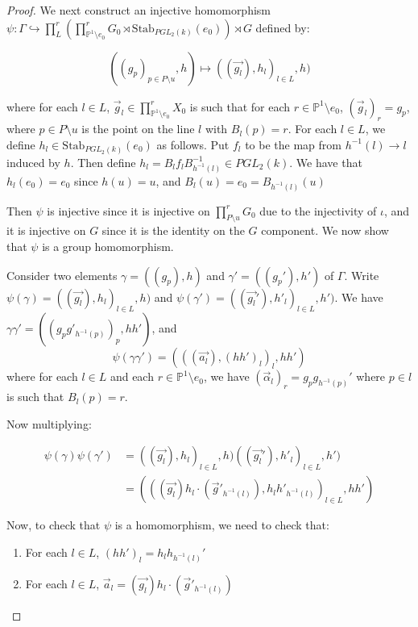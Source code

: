 \documentclass[12pt]{article}
\theoremstyle{definition}
\begin{document}
\begin{proof}
    We next construct an injective homomorphism $\psi: \Gamma \hookrightarrow \prod_L^{r}  (\prod_{\mathbb{P}^1\setminus e_0}^rG_0 \rtimes \mathrm{Stab}_{PGL_2(k)}(e_0)) \rtimes  G$ defined by: 

    $$((g_p)_{p \in P \setminus u}, h) \mapsto ((\vec{g_l}), h_l)_{l \in L}, h)$$

    where for each $l \in L$, $\vec{g}_l \in \prod_{\mathbb{P}^1\setminus e_0}^r X_0$ is such that for each $r \in \mathbb{P}^1 \setminus e_0$, $(\vec{g}_l)_r = g_p$, where $p \in P \setminus u$ is the point on the line $l$ with $B_l(p) = r$. For each $l \in L$, we define $h_l \in \mathrm{Stab}_{PGL_2(k)}(e_0)$ as follows. Put $f_l$ to be the map from $h^{-1}(l) \to l$ induced by $h$. Then define $h_l = B_l f_l B_{h^{-1}(l)}^{-1} \in PGL_2(k)$. We have that $h_l(e_0) = e_0$ since $h(u) = u$, and $B_l(u) = e_0 = B_{h^{-1}(l)}(u)$

    Then $\psi$ is injective since it is injective on $\prod_{P \setminus u}^{r} G_0$ due to the injectivity of $\iota$, and it is injective on $G$ since it is the identity on the $G$ component. We now show that $\psi$ is a group homomorphism. 

    Consider two elements $\gamma = ((g_p), h)$ and $\gamma'=((g_p'), h')$ of $\Gamma$. Write $\psi(\gamma) = ((\vec{g_l}), h_l)_{l \in L}, h)$ and $\psi(\gamma') = ((\vec{g_l}'), h'_l)_{l \in L}, h')$. We have $\gamma \gamma' = ((g_p g'_{h^{-1}(p)})_p, hh')$, and 
    $$\psi(\gamma \gamma') = (((\vec{a_l}), (hh')_{l})_{l}, hh')$$ where for each $l \in L$ and each $r \in \mathbb{P}^1 \setminus e_0$, we have $(\vec{\alpha}_l)_r = g_p g_{h^{-1}(p)}'$ where $p \in l$ is such that $B_{l}(p) = r$.

    Now multiplying: 

    \begin{align*}
        \psi(\gamma)\psi(\gamma') &= ((\vec{g_l}), h_l)_{l \in L}, h)((\vec{g_l}'), h'_l)_{l \in L}, h')\\
        &= (((\vec{g_l})h_l \cdot(\vec{g}'_{h^{-1}(l)}), h_l h'_{h^{-1}(l)})_{l \in L}, hh')
    \end{align*}

    Now, to check that $\psi$ is a homomorphism, we need to check that: 

    \begin{enumerate}
        \item For each $l \in L$, $(hh')_l = h_lh_{h^{-1}(l)}'$
        \item For each $l \in L$, $\vec{a}_l = (\vec{g_l})h_l \cdot(\vec{g}'_{h^{-1}(l)})$
    \end{enumerate}


\end{proof}
\end{document}
